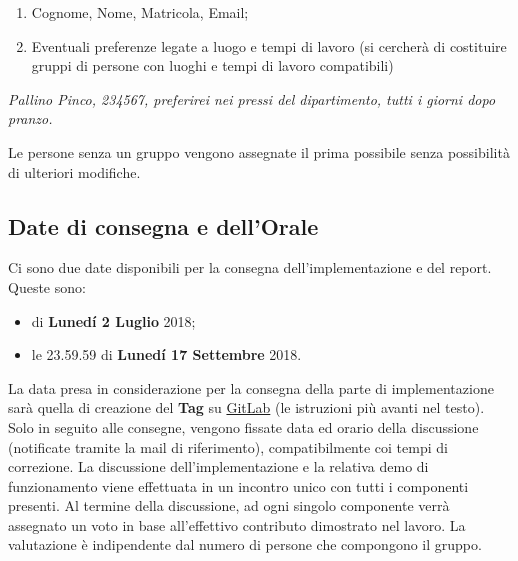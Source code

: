 \begin{enumerate}
 \item Cognome, Nome, Matricola, Email;
 \item Eventuali preferenze legate a luogo e tempi di lavoro (si cercherà di costituire gruppi di persone con luoghi e tempi di lavoro compatibili)
\end{enumerate}

\begin{tcolorbox}[colback=green!20!white,colframe=green!75!black,title=Email di esempio con oggetto \textbf{CERCO GRUPPO LSO}]
 \textit{Pallino Pinco, 234567, preferirei nei pressi del dipartimento, tutti i giorni dopo pranzo.}
\end{tcolorbox}
Le persone senza un gruppo vengono assegnate il prima possibile senza possibilità di ulteriori modifiche.

\subsection{Date di consegna e dell'Orale}

Ci sono due date disponibili per la consegna dell'implementazione e del report.
Queste sono:

\begin{itemize}
 \item {} di \textbf{Lunedí 2 Luglio} 2018;
 \item le 23.59.59 di \textbf{Lunedí 17 Settembre} 2018.
\end{itemize}

La data presa in considerazione per la consegna della parte di implementazione
sarà quella di creazione del \textbf{Tag} su \href{https://gitlab.com}{GitLab}
(le istruzioni più avanti nel testo). Solo in seguito alle consegne, vengono
fissate data ed orario della discussione (notificate tramite la mail di
riferimento), compatibilmente coi tempi di correzione. La discussione
dell'implementazione e la relativa demo di funzionamento viene effettuata in un
incontro unico con tutti i componenti presenti. Al termine della discussione, ad
ogni singolo componente verrà assegnato un voto in base all'effettivo contributo
dimostrato nel lavoro. La valutazione è indipendente dal numero di persone che
compongono il gruppo.

